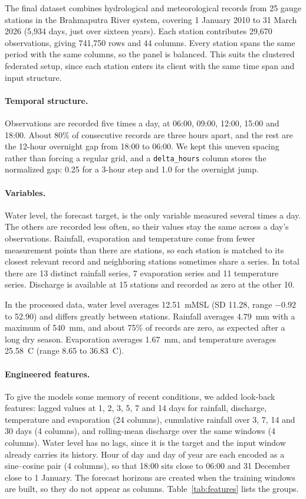 The final dataset combines hydrological and meteorological records from 25 gauge
stations in the Brahmaputra River system, covering 1 January 2010 to 31 March
2026 (5{,}934 days, just over sixteen years). Each station contributes
29{,}670 observations, giving 741{,}750 rows and 44 columns. Every station spans
the same period with the same columns, so the panel is balanced. This suits the
clustered federated setup, since each station enters its client with the same
time span and input structure.

\paragraph{Temporal structure.}
Observations are recorded five times a day, at 06:00, 09:00, 12:00, 15:00 and
18:00. About 80\% of consecutive records are three hours apart, and the rest are
the 12-hour overnight gap from 18:00 to 06:00. We kept this uneven spacing rather
than forcing a regular grid, and a \texttt{delta\_hours} column stores the
normalized gap: 0.25 for a 3-hour step and 1.0 for the overnight jump.

\paragraph{Variables.}
Water level, the forecast target, is the only variable measured several times a
day. The others are recorded less often, so their values stay the same across a
day's observations. Rainfall, evaporation and temperature come from fewer
measurement points than there are stations, so each station is matched to its
closest relevant record and neighboring stations sometimes share a series. In
total there are 13 distinct rainfall series, 7 evaporation series and 11
temperature series. Discharge is available at 15 stations and recorded as zero at
the other 10.

In the processed data, water level averages 12.51~mMSL (SD 11.28, range $-0.92$
to 52.90) and differs greatly between stations. Rainfall averages 4.79~mm with a
maximum of 540~mm, and about 75\% of records are zero, as expected after a long
dry season. Evaporation averages 1.67~mm, and temperature averages
25.58~\textdegree C (range 8.65 to 36.83~\textdegree C).

\paragraph{Engineered features.}
To give the models some memory of recent conditions, we added look-back features:
lagged values at 1, 2, 3, 5, 7 and 14 days for rainfall, discharge, temperature
and evaporation (24 columns), cumulative rainfall over 3, 7, 14 and 30 days
(4 columns), and rolling-mean discharge over the same windows (4 columns). Water
level has no lags, since it is the target and the input window already carries
its history. Hour of day and day of year are each encoded as a sine--cosine pair
(4 columns), so that 18:00 sits close to 06:00 and 31 December close to
1 January. The forecast horizons are created when the training windows are built,
so they do not appear as columns. Table~\ref{tab:features} lists the groups.

